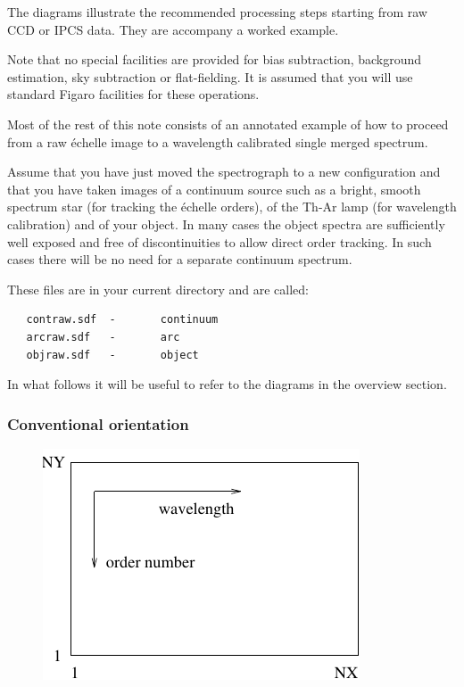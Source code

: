 \documentclass[11pt,twoside]{article}
\newcommand{\htmladdimg}[1]{}
\newenvironment{latexonly}{}{}
\begin{document}
   The diagrams illustrate the recommended processing steps starting
   from raw CCD or IPCS data. They are accompany a worked example.

   Note that no special facilities are provided for bias subtraction,
   background estimation, sky subtraction or flat-fielding. It is
   assumed that you will use standard Figaro facilities for these
   operations.

   Most of the rest of this note consists of an annotated example of how
   to proceed from a raw \'echelle image to a wavelength calibrated
   single merged spectrum.

   Assume that you have just moved the spectrograph to a new
   configuration and that you have taken images of a continuum source
   such as a bright, smooth spectrum star (for tracking the
   \'echelle orders), of the Th-Ar lamp (for wavelength
   calibration) and of your object. In many cases the object spectra are
   sufficiently well exposed and free of discontinuities to allow direct
   order tracking. In such cases there will be no need for a separate
   continuum spectrum.

   These files are in your current directory and are called:

\begin{verbatim}
   contraw.sdf  -       continuum
   arcraw.sdf   -       arc
   objraw.sdf   -       object
\end{verbatim}

   In what follows it will be useful to refer to the diagrams in the
   overview section.


\subsubsection{\label{techno13orient}Conventional orientation}

\begin{latexonly}
\begin{figure}[htb]
\begin{center}
\includegraphics{sun86_ech5}
\end{center}
\end{figure}
\end{latexonly}
\htmladdimg{echelle5.png}
\end{document}
